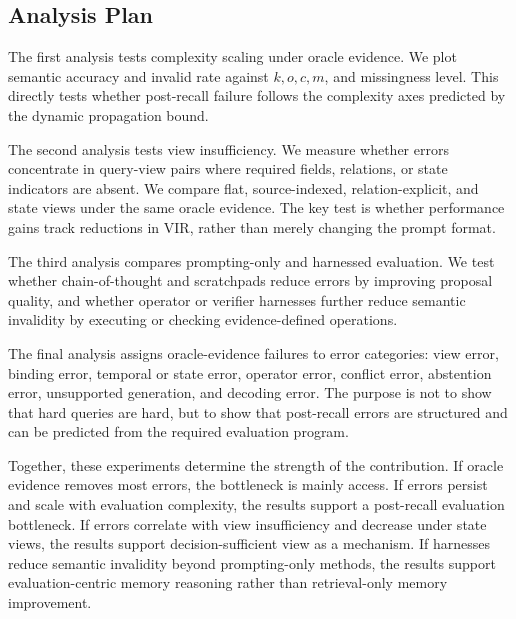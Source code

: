 \subsection{Analysis Plan}
\label{subsec:analysis-plan}

The first analysis tests complexity scaling under oracle evidence.
We plot semantic accuracy and invalid rate against $k,o,c,m$, and missingness level.
This directly tests whether post-recall failure follows the complexity axes predicted by the dynamic propagation bound.

The second analysis tests view insufficiency.
We measure whether errors concentrate in query-view pairs where required fields, relations, or state indicators are absent.
We compare flat, source-indexed, relation-explicit, and state views under the same oracle evidence.
The key test is whether performance gains track reductions in $\mathrm{VIR}$, rather than merely changing the prompt format.

The third analysis compares prompting-only and harnessed evaluation.
We test whether chain-of-thought and scratchpads reduce errors by improving proposal quality, and whether operator or verifier harnesses further reduce semantic invalidity by executing or checking evidence-defined operations.

The final analysis assigns oracle-evidence failures to error categories: view error, binding error, temporal or state error, operator error, conflict error, abstention error, unsupported generation, and decoding error.
The purpose is not to show that hard queries are hard, but to show that post-recall errors are structured and can be predicted from the required evaluation program.

Together, these experiments determine the strength of the contribution.
If oracle evidence removes most errors, the bottleneck is mainly access.
If errors persist and scale with evaluation complexity, the results support a post-recall evaluation bottleneck.
If errors correlate with view insufficiency and decrease under state views, the results support decision-sufficient view as a mechanism.
If harnesses reduce semantic invalidity beyond prompting-only methods, the results support evaluation-centric memory reasoning rather than retrieval-only memory improvement.


